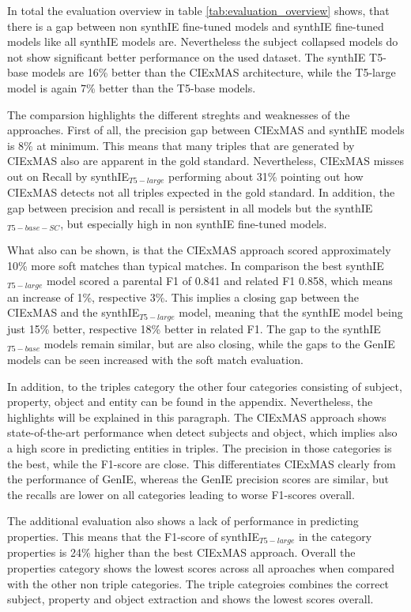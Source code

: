 \documentclass[a4paper,oneside,bibliography=totoc]{scrbook}
\begin{document}
In total the evaluation overview in table \ref{tab:evaluation_overview} shows, that there is a gap between non synthIE fine-tuned models and synthIE fine-tuned models like all synthIE models are. Nevertheless the subject collapsed models do not show significant better performance on the used dataset. The synthIE T5-base models are 16\% better than the CIExMAS architecture, while the T5-large model is again 7\% better than the T5-base models.

The comparsion highlights the different streghts and weaknesses of the approaches. First of all, the precision gap between CIExMAS and synthIE models is 8\% at minimum. This means that many triples that are generated by CIExMAS also are apparent in the gold standard. Nevertheless, CIExMAS misses out on Recall by synthIE$_{T5-large}$ performing about 31\% pointing out how CIExMAS detects not all triples expected in the gold standard. In addition, the gap between precision and recall is persistent in all models but the synthIE$_{T5-base-SC}$, but especially high in non synthIE fine-tuned models.

What also can be shown, is that the CIExMAS approach scored approximately 10\% more soft matches than typical matches. In comparison the best synthIE$_{T5-large}$ model scored a parental F1 of 0.841 and related F1 0.858, which means an increase of 1\%, respective 3\%. This implies a closing gap between the CIExMAS and the synthIE$_{T5-large}$ model, meaning that the synthIE model being just 15\% better, respective 18\% better in related F1. The gap to the synthIE$_{T5-base}$ models remain similar, but are also closing, while the gaps to the GenIE models can be seen increased with the soft match evaluation.

In addition, to the triples category the other four categories consisting of subject, property, object and entity can be found in the appendix. Nevertheless, the highlights will be explained in this paragraph. The CIExMAS approach shows state-of-the-art performance when detect subjects and object, which implies also a high score in predicting entities in triples. The precision in those categories is the best, while the F1-score are close. This differentiates CIExMAS clearly from the performance of GenIE, whereas the GenIE precision scores are similar, but the recalls are lower on all categories leading to worse F1-scores overall.

The additional evaluation also shows a lack of performance in predicting properties. This means that the F1-score of synthIE$_{T5-large}$ in the category properties is 24\% higher than the best CIExMAS approach. Overall the properties category shows the lowest scores across all aproaches when compared with the other non triple categories. The triple categroies combines the correct subject, property and object extraction and shows the lowest scores overall.
\end{document}
